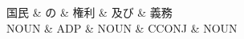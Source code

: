 \documentclass[tikz,border=5pt]{standalone}
\begin{document}
\normalsize
\begin{dependency}[edge unit distance=12.0pt]
    \begin{deptext}[column sep=1em]
        国民 \& の \& 権利 \& 及び \& 義務\\
        NOUN \& ADP \& NOUN \& CCONJ \& NOUN\\
    \end{deptext}
\end{dependency}
\end{document}
